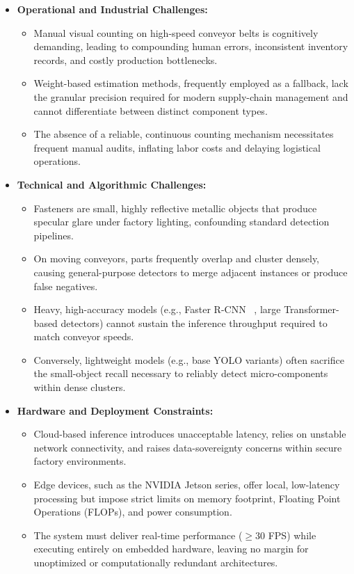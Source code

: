 \begin{itemize}
    \item \textbf{Operational and Industrial Challenges:}
    \begin{itemize}
        \item Manual visual counting on high-speed conveyor belts is cognitively demanding, leading to compounding human errors, inconsistent inventory records, and costly production bottlenecks.
        \item Weight-based estimation methods, frequently employed as a fallback, lack the granular precision required for modern supply-chain management and cannot differentiate between distinct component types.
        \item The absence of a reliable, continuous counting mechanism necessitates frequent manual audits, inflating labor costs and delaying logistical operations.
    \end{itemize}

    \item \textbf{Technical and Algorithmic Challenges:}
    \begin{itemize}
        \item Fasteners are small, highly reflective metallic objects that produce specular glare under factory lighting, confounding standard detection pipelines.
        \item On moving conveyors, parts frequently overlap and cluster densely, causing general-purpose detectors to merge adjacent instances or produce false negatives.
        \item Heavy, high-accuracy models (e.g., Faster R-CNN ~\cite{ren2016fasterrcnnrealtimeobject}, large Transformer-based detectors) cannot sustain the inference throughput required to match conveyor speeds.
        \item Conversely, lightweight models (e.g., base YOLO variants) often sacrifice the small-object recall necessary to reliably detect micro-components within dense clusters.
    \end{itemize}

    \item \textbf{Hardware and Deployment Constraints:}
    \begin{itemize}
        \item Cloud-based inference introduces unacceptable latency, relies on unstable network connectivity, and raises data-sovereignty concerns within secure factory environments.
        \item Edge devices, such as the NVIDIA Jetson series, offer local, low-latency processing but impose strict limits on memory footprint, Floating Point Operations (FLOPs), and power consumption.
        \item The system must deliver real-time performance ($\geq 30$ FPS) while executing entirely on embedded hardware, leaving no margin for unoptimized or computationally redundant architectures.
    \end{itemize}
\end{itemize}

